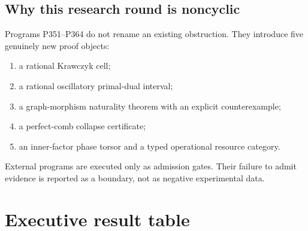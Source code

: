 \documentclass[11pt,a4paper,openany]{report}
\begin{document}
\section{Why this research round is noncyclic}

Programs P351--P364 do not rename an existing obstruction. They introduce five genuinely new proof objects:

\begin{enumerate}
\item 
a rational Krawczyk cell;

\item 
a rational oscillatory primal-dual interval;

\item 
a graph-morphism naturality theorem with an explicit counterexample;

\item 
a perfect-comb collapse certificate;

\item 
an inner-factor phase torsor and a typed operational resource category.

\end{enumerate}

External programs are executed only as admission gates. Their failure to admit evidence is reported as a boundary, not as negative experimental data.

\chapter{Executive result table}
\end{document}
